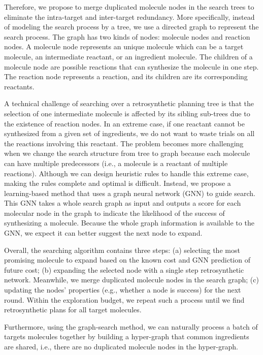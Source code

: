 \documentclass[sigconf]{acmart}
\begin{document}
Therefore, we propose to merge duplicated molecule nodes in the search trees to eliminate the intra-target and inter-target redundancy.
More specifically, instead of modeling the search process by a tree, we use a directed graph to represent the search process.
The graph has two kinds of nodes: molecule nodes and reaction nodes. A molecule node represents an unique molecule which can be a target molecule, an intermediate reactant, or an ingredient molecule. The children of a molecule node are possible reactions that can synthesize the molecule in one step. The reaction node represents a reaction, and its children are its corresponding reactants.

A technical challenge of searching over a retrosynthetic planning tree is that the selection of one intermediate molecule is affected by its sibling sub-trees due to the existence of reaction nodes.
In an extreme case, if one reactant cannot be synthesized from a given set of ingredients, we do not want to waste trials on all the reactions involving this reactant.
The problem becomes more challenging when we change the search structure from tree to graph because each molecule can have multiple predecessors (i.e., a molecule is a reactant of multiple reactions).
Although we can design heuristic rules to handle this extreme case, making the rules complete and optimal is difficult.
Instead, we propose a learning-based method that uses a graph neural network (GNN) to guide search. This GNN takes a whole search graph as input and outputs a score for each molecular node in the graph to indicate the likelihood of the success of synthesizing a molecule.
Because the whole graph information is available to the GNN, we expect it can better suggest the next node to expand.



Overall, the searching algorithm contains three steps: (a) selecting the most promising molecule to expand based on the known cost and GNN prediction of future cost; (b) expanding the selected node with a single step retrosynthetic network. Meanwhile, we merge duplicated molecule nodes in the search graph; (c) updating the nodes' properties (e.g., whether a node is success) for the next round. Within the exploration budget, we repeat such a process until we find retrosynthetic plans for all target molecules.

Furthermore, using the graph-search method, we can naturally process a batch of targets molecules together by building a hyper-graph that common ingredients are shared, i.e., there are no duplicated molecule nodes in the hyper-graph. 
\end{document}
